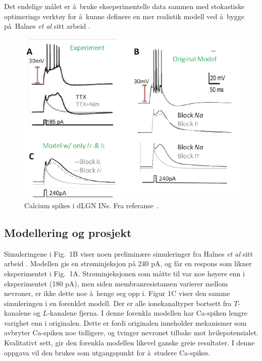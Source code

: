 \documentclass[10pt]{article}
\begin{document}
Det endelige m\aa let er \aa\ bruke ekseperimentelle data sammen med
stokastiske optimerings verkt\o y for \aa\ kunne definere en mer
realistik modell ved \aa\ bygge p\aa\ Halnes {\em et al} sitt arbeid \cite{Halnes2011}. 
\begin{figure}[htb]
\includegraphics[width=1.0\textwidth]{fig1.png}
\caption{Calcium spikes i dLGN INs. Fra referanse~\cite{AcunaGoycholea2008}.}
\end{figure}

\subsection*{Modellering og prosjekt}

Simuleringene i  Fig.~1B viser noen preliminære simuleringer
fra Halnes {\em et al} sitt arbeid \cite{Halnes2011}. Modellen gis en strøminjeksjon
på 240 pA, og f\aa r en respons som likner eksperimentet i
Fig.~1A. Str\o minjeksjonen som m\aa tte til var noe h\o yere enn i
eksperimentet (180 pA), men siden membranresistansen varierer mellom
nevroner, er ikke dette noe \aa\ henge seg opp i. Figur 1C viser den
samme simuleringen i en forenklet modell. Der er alle 
ionekanaltyper bortsett fra $T$-kanalene og $L$-kanalene fjerna. I denne forenkla
modellen har Ca-spiken lengre varighet enn i originalen. Dette er
fordi originalen inneholder mekanismer som avbryter Ca-spiken noe
tidligere, og tvinger nevronet tilbake mot
hvilepotensialet. Kvalitativt sett, gir den forenkla modellen
likevel ganske greie resultater. I denne oppgava vil den brukes som  utgangspunkt
for \aa\ studere Ca-spikes.
\end{document}
